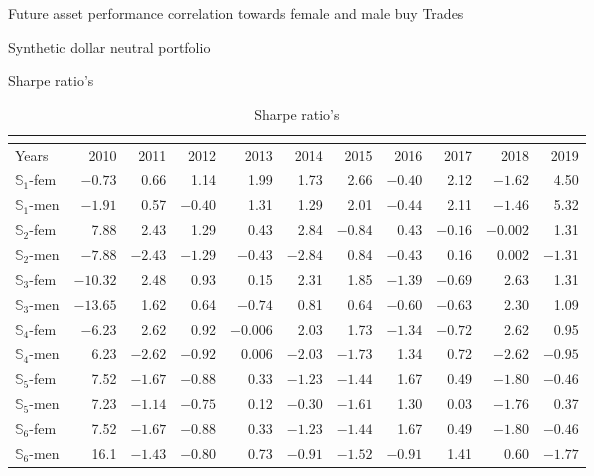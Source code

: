 \documentclass{beamer}
\begin{document}
\begin{frame}{Future asset performance correlation towards female and male buy Trades}
\begin{frame}{Synthetic dollar neutral portfolio}
\begin{itemize}
\end{itemize}

\end{frame}

\begin{frame}{Sharpe ratio's}
\begin{table}[htbp]
    \centering
    \caption{Sharpe ratio's}
    \label{tab:Sharpe}
    \tiny
\begin{tabular}{ lrrrrrrrrrr } 
 \multicolumn{1}{c}{} \\
 \toprule
Years&2010&2011&2012&2013&2014&2015&2016&2017&2018&2019\\
\midrule
$\mathbb{S}_1$-fem&$-0.73$&0.66&1.14&1.99&1.73&2.66&$-0.40$&2.12&$-1.62$&4.50\\

$\mathbb{S}_1$-men&$-1.91$&0.57&$-0.40$&1.31&1.29&2.01&$-0.44$&2.11&$-1.46$&5.32\\

$\mathbb{S}_2$-fem&7.88&2.43&1.29&0.43&2.84 &$-0.84$&0.43&$-0.16$&$-0.002$&1.31\\

$\mathbb{S}_2$-men&$-7.88$&$-2.43$&$-1.29$&$-0.43$&$-2.84$&0.84&$-0.43$&0.16&0.002&$-1.31$\\

$\mathbb{S}_3$-fem&$-10.32$&2.48&0.93&0.15&2.31&1.85&$-1.39$&$-0.69$&2.63&1.31\\

$\mathbb{S}_3$-men&$-13.65$&1.62&0.64&$-0.74$&0.81&0.64&$-0.60$&$-0.63$&2.30&1.09\\

$\mathbb{S}_4$-fem&$-6.23$&2.62&0.92&$-0.006$&2.03&1.73&$-1.34$&$-0.72$&2.62&0.95\\

$\mathbb{S}_4$-men&6.23&$-2.62$&$-0.92$&0.006&$-2.03$&$-1.73$&1.34&0.72&$-2.62$&$-0.95$\\

$\mathbb{S}_5$-fem&7.52&$-1.67$&$-0.88$&0.33&$-1.23$&$-1.44$&1.67&0.49&$-1.80$&$-0.46$\\

$\mathbb{S}_5$-men&7.23&$-1.14$&$-0.75$&0.12&$-0.30$&$-1.61$&1.30&0.03&$-1.76$&0.37\\

$\mathbb{S}_6$-fem&7.52&$-1.67$&$-0.88$&0.33&$-1.23$&$-1.44$&1.67&0.49&$-1.80$&$-0.46$\\

$\mathbb{S}_6$-men&16.1&$-1.43$&$-0.80$&0.73&$-0.91$&$-1.52$&$-0.91$&1.41&0.60&$-1.77$\\


\end{tabular}
\end{table}
\end{frame}
\end{frame}
\end{document}
